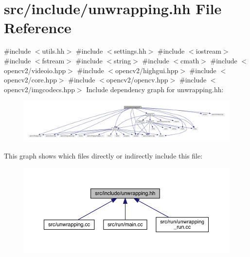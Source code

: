 \hypertarget{unwrapping_8hh}{}\section{src/include/unwrapping.hh File Reference}
\label{unwrapping_8hh}
{\ttfamily \#include $<$utils.\+hh$>$}\newline
{\ttfamily \#include $<$settings.\+hh$>$}\newline
{\ttfamily \#include $<$iostream$>$}\newline
{\ttfamily \#include $<$fstream$>$}\newline
{\ttfamily \#include $<$string$>$}\newline
{\ttfamily \#include $<$cmath$>$}\newline
{\ttfamily \#include $<$opencv2/videoio.\+hpp$>$}\newline
{\ttfamily \#include $<$opencv2/highgui.\+hpp$>$}\newline
{\ttfamily \#include $<$opencv2/core.\+hpp$>$}\newline
{\ttfamily \#include $<$opencv2/opencv.\+hpp$>$}\newline
{\ttfamily \#include $<$opencv2/imgcodecs.\+hpp$>$}\newline
Include dependency graph for unwrapping.\+hh\+:
\nopagebreak
\begin{figure}[H]
\begin{center}
\leavevmode
\includegraphics[width=350pt]{unwrapping_8hh__incl}
\end{center}
\end{figure}
This graph shows which files directly or indirectly include this file\+:
\nopagebreak
\begin{figure}[H]
\begin{center}
\leavevmode
\includegraphics[width=350pt]{unwrapping_8hh__dep__incl}
\end{center}
\end{figure}
